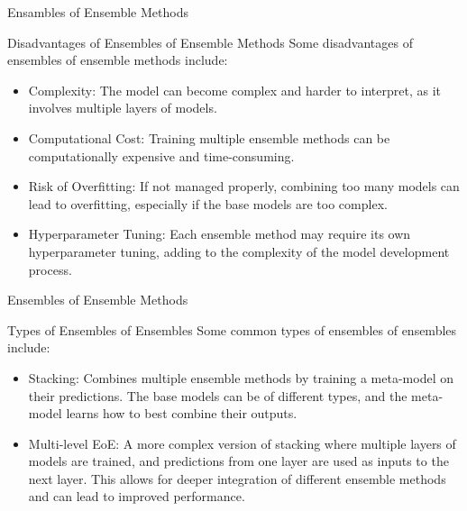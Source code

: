 \documentclass[hyperref={pdfpagelabels=false},aspectratio=169]{beamer}
\begin{document}
\begin{frame}[label={sec:org023a6ac}]{Ensambles of Ensemble Methods}
\begin{block}{Disadvantages of Ensembles of Ensemble Methods}
\pause
Some disadvantages of ensembles of ensemble methods include:
\begin{itemize}[<+->]
\item \alert{Complexity}: The model can become complex and harder to interpret, as it involves multiple layers of models.
\item \alert{Computational Cost}: Training multiple ensemble methods can be computationally expensive and time-consuming.
\item \alert{Risk of Overfitting}: If not managed properly, combining too many models can lead to overfitting, especially if the base models are too complex.
\item \alert{Hyperparameter Tuning}: Each ensemble method may require its own hyperparameter tuning, adding to the complexity of the model development process.
\end{itemize}
\end{block}
\end{frame}
\begin{frame}[label={sec:org9848d19}]{Ensembles of Ensemble Methods}
\begin{block}{Types of Ensembles of Ensembles}
\pause
Some common types of ensembles of ensembles include:
\begin{itemize}[<+->]
\item \alert{Stacking}: Combines multiple ensemble methods by training a meta-model on their predictions. The base models can be of different types, and the meta-model learns how to best combine their outputs.
\item \alert{Multi-level EoE}: A more complex version of stacking where multiple layers of models are trained, and predictions from one layer are used as inputs to the next layer. This allows for deeper integration of different ensemble methods and can lead to improved performance.
\end{itemize}
\end{block}
\end{frame}
\end{document}
